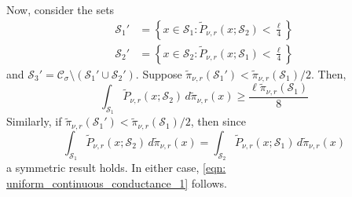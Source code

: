 \documentclass[11pt,twoside]{article}
\theoremstyle{definition}
\newcommand{\set}[1]{\left\{#1\right\}}
\newcommand{\1}{\mathbbm{1}}
\newcommand{\Sset}{\mathcal{S}}
\newcommand{\Cset}{\mathcal{C}}
\newcommand{\Csig}{\Cset_{\sigma}}
\begin{document}
Now, consider the sets
\begin{align*}
\Sset_1' & = \set{x \in \Sset_1: \widetilde{P}_{\nu,r}(x; \Sset_2) < \frac{\ell}{4}} \\
\Sset_2' & = \set{x \in \Sset_2: \widetilde{P}_{\nu,r}(x; \Sset_1) < \frac{\ell}{4}}
\end{align*}
and $\Sset_3' = \Csig \setminus (\Sset_1' \cup \Sset_2')$. Suppose $\widetilde{\pi}_{\nu,r}(\Sset_1') < \widetilde{\pi}_{\nu,r}(\Sset_1)/2$. Then,
\begin{equation*}
\int_{\Sset_1} \widetilde{P}_{\nu,r}(x; \Sset_2) \,d\widetilde{\pi}_{\nu,r}(x) \geq \frac{\ell \widetilde{\pi}_{\nu,r}(\Sset_1)}{8}
\end{equation*}
Similarly, if $\widetilde{\pi}_{\nu,r}(\Sset_1') < \widetilde{\pi}_{\nu,r}(\Sset_1)/2$, then since
\begin{equation*}
\int_{\Sset_1} \widetilde{P}_{\nu,r}(x; \Sset_2) \,d\widetilde{\pi}_{\nu,r}(x) = \int_{\Sset_2} \widetilde{P}_{\nu,r}(x; \Sset_1) \,d\widetilde{\pi}_{\nu,r}(x)
\end{equation*}
a symmetric result holds. In either case, \eqref{eqn: uniform_continuous_conductance_1} follows.
\end{document}

